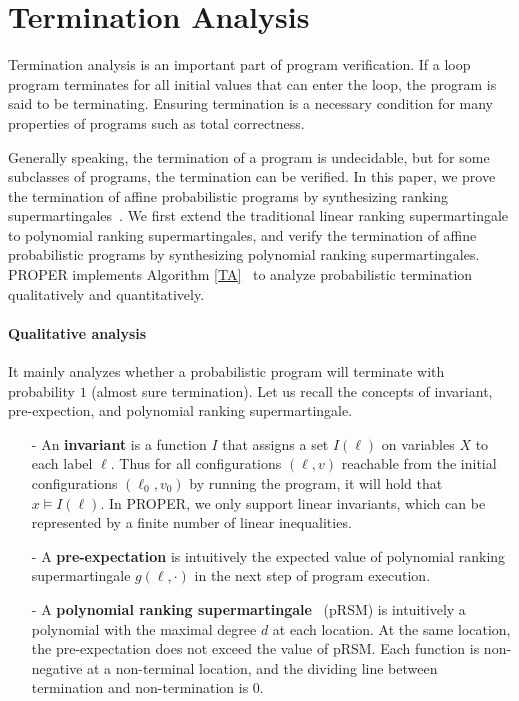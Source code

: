 \documentclass[runningheads]{llncs}
\begin{document}
\section{Termination Analysis}
Termination analysis is an important part of program verification. If a loop program terminates for all initial values that can enter the loop, the program is said to be terminating. Ensuring termination is a necessary condition for many properties of programs such as total correctness. 

Generally speaking, the termination of a program is undecidable, but for some subclasses of programs, the termination can be verified. In this paper, we prove the termination of affine probabilistic programs by synthesizing ranking supermartingales~\cite{Chakarov2013Martingales}. We first extend the traditional linear ranking supermartingale to polynomial ranking supermartingales, and verify the termination of affine probabilistic programs by synthesizing polynomial ranking supermartingales. PROPER implements Algorithm \ref{TA}~\cite{kris2016termination,cha2015algorithmic} to analyze probabilistic termination qualitatively and quantitatively.  

\paragraph{Qualitative analysis} It mainly analyzes whether a probabilistic program will terminate with probability $1$ (almost sure termination).
Let us recall the concepts of invariant, pre-expection, and polynomial ranking supermartingale.
\begin{enumerate}
	\item[-] An \textbf{invariant} is a function $I$ that assigns a set $I(\ell)$ on variables $X$ to each label $\ell$. Thus for all configurations $(\ell,v)$  reachable from the initial configurations $(\ell_0, v_0)$ by running the program, it will hold that $x \vDash I(\ell)$. In PROPER, we only support linear invariants, which can be represented by a finite number of linear inequalities.
	\item[-] A \textbf{pre-expectation} is intuitively the expected value of polynomial ranking  supermartingale $g(\ell,\cdot)$ in the next step of program execution.
	\item[-] A \textbf{polynomial ranking supermartingale}~\cite{Chakarov2013Martingales} (pRSM) is intuitively a polynomial with the maximal degree $d$ at each location. At the same location, the pre-expectation does not exceed the value of pRSM. Each function is non-negative at a non-terminal location, and the dividing line between termination and non-termination is 0.
\end{enumerate}
\end{document}
